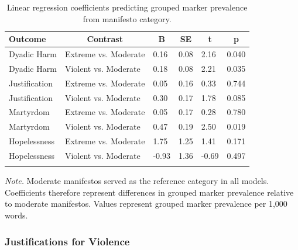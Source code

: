\documentclass[
  english,
  man,floatsintext]{apa6}
\begin{document}
\begin{table}[tbp]

\begin{center}
\begin{threeparttable}

\caption{\label{tab:manifesto-regressions}Linear regression coefficients predicting grouped marker prevalence from manifesto category.}

\begin{tabular}{llllll}
\toprule
Outcome & \multicolumn{1}{c}{Contrast} & \multicolumn{1}{c}{B} & \multicolumn{1}{c}{SE} & \multicolumn{1}{c}{t} & \multicolumn{1}{c}{p}\\
\midrule
Dyadic Harm & Extreme vs. Moderate & 0.16 & 0.08 & 2.16 & 0.040\\
Dyadic Harm & Violent vs. Moderate & 0.18 & 0.08 & 2.21 & 0.035\\
Justification & Extreme vs. Moderate & 0.05 & 0.16 & 0.33 & 0.744\\
Justification & Violent vs. Moderate & 0.30 & 0.17 & 1.78 & 0.085\\
Martyrdom & Extreme vs. Moderate & 0.05 & 0.17 & 0.28 & 0.780\\
Martyrdom & Violent vs. Moderate & 0.47 & 0.19 & 2.50 & 0.019\\
Hopelessness & Extreme vs. Moderate & 1.75 & 1.25 & 1.41 & 0.171\\
Hopelessness & Violent vs. Moderate & -0.93 & 1.36 & -0.69 & 0.497\\
\bottomrule
\addlinespace
\end{tabular}

\begin{tablenotes}[para]
\normalsize{\textit{Note.} Moderate manifestos served as the reference category in all models. Coefficients therefore represent differences in grouped marker prevalence relative to moderate manifestos. Values represent grouped marker prevalence per 1,000 words.}
\end{tablenotes}

\end{threeparttable}
\end{center}

\end{table}

\subsubsection{Justifications for Violence}\label{justifications-for-violence}
\end{document}
